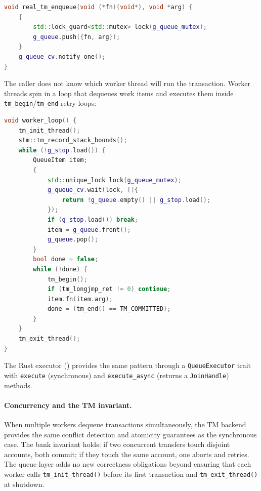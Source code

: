 \begin{lstlisting}[language=C++, caption={Enqueuing a transaction (\texttt{queue\_runtime.cpp}).}]
void real_tm_enqueue(void (*fn)(void*), void *arg) {
    {
        std::lock_guard<std::mutex> lock(g_queue_mutex);
        g_queue.push({fn, arg});
    }
    g_queue_cv.notify_one();
}
\end{lstlisting}

\noindent
The caller does not know which worker thread will run the transaction.
Worker threads spin in a loop that dequeues work items and executes them
inside \texttt{tm\_begin}/\texttt{tm\_end} retry loops:

\begin{lstlisting}[language=C++, caption={Worker loop (\texttt{queue\_runtime.cpp}).}]
void worker_loop() {
    tm_init_thread();
    stm::tm_record_stack_bounds();
    while (!g_stop.load()) {
        QueueItem item;
        {
            std::unique_lock lock(g_queue_mutex);
            g_queue_cv.wait(lock, []{
                return !g_queue.empty() || g_stop.load();
            });
            if (g_stop.load()) break;
            item = g_queue.front();
            g_queue.pop();
        }
        bool done = false;
        while (!done) {
            tm_begin();
            if (tm_longjmp_ret != 0) continue;
            item.fn(item.arg);
            done = (tm_end() == TM_COMMITTED);
        }
    }
    tm_exit_thread();
}
\end{lstlisting}

\noindent
The Rust executor ()
provides the same pattern through a \texttt{QueueExecutor} trait with
\texttt{execute} (synchronous) and \texttt{execute\_async} (returns a
\texttt{JoinHandle}) methods.

\paragraph{Concurrency and the TM invariant.}
When multiple workers dequeue transactions simultaneously, the TM backend
provides the same conflict detection and atomicity guarantees as the
synchronous case.  The bank invariant holds: if two concurrent transfers
touch disjoint accounts, both commit; if they touch the same account, one
aborts and retries.  The queue layer adds no new correctness obligations
beyond ensuring that each worker calls \texttt{tm\_init\_thread()} before
its first transaction and \texttt{tm\_exit\_thread()} at shutdown.

